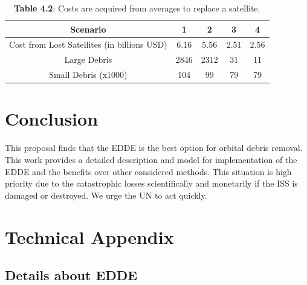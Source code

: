 \documentclass{article}
\theoremstyle{plain}			%
\theoremstyle{definition}		%
\theoremstyle{remark}
\numberwithin{equation}{section}
\numberwithin{figure}{section}
\numberwithin{table}{section}
\begin{document}
\begin{table}[H]
\centering
\begin{tabular}{| c | c  | c | c | c|  }
\hline
 Scenario & 1 & 2 & 3 & 4\\
\hline
Cost from Lost Satellites (in billions USD)& 6.16 & 5.56 & 2.51 & 2.56 \\
\hline
Large Debris & 2846 & 2312 & 31 & 11 \\
\hline
Small Debris (x1000) & 104 & 99 & 79 & 79 \\
\hline
\end{tabular}
\caption*{\small{\textbf{Table 4.2}: Costs are acquired from averages to replace a satellite.}}
\label{Modeltab1}
\end{table}

\section{Conclusion}
This proposal finds that the EDDE is the best option for orbital debris removal. This work provides a detailed description and model for implementation of the EDDE and the benefits over other considered methods. This situation is high priority due to the catastrophic losses scientifically and monetarily if the ISS is damaged or destroyed.  We urge the UN to act quickly.




\newpage
\section{Technical Appendix}
\subsection{Details about EDDE}
\end{document}
